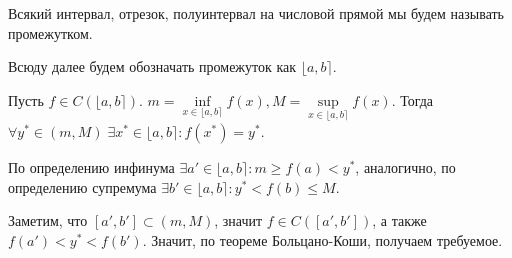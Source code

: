 \Endproof

\Def Всякий интервал, отрезок, полуинтервал на числовой прямой мы будем называть промежутком.

\Def Всюду далее будем обозначать промежуток как $\lfloor a, b\rceil$.

 Пусть $f \in C(\lfloor a, b\rceil)$. $m = \inf\limits_{x \in \lfloor a, b\rceil} f(x), M = \sup\limits_{x \in \lfloor a, b\rceil} f(x)$.
Тогда $\forall y^* \in (m, M) \; \exists x^* \in \lfloor a, b\rceil: f(x^*) = y^*$.

\Proof

По определению инфинума $\exists a' \in \lfloor a, b\rceil: m \geq f(a) < y^*$, аналогично, по определению супремума $\exists b' \in \lfloor a, b\rceil: y^* < f(b) \leq M$.

Заметим, что $[a', b'] \subset (m, M)$, значит $f \in C([a', b'])$, а также $f(a') < y^* < f(b')$. Значит, по теореме Больцано-Коши, получаем требуемое.

\Endproof
